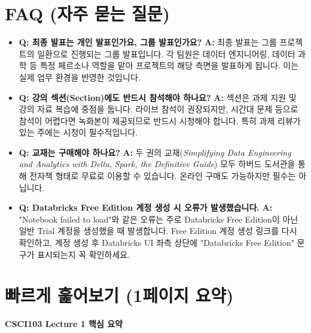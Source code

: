 \documentclass[11pt,a4paper]{article}
\theoremstyle{definition}
\begin{document}
\begin{itemize}
\newpage

\section*{FAQ (자주 묻는 질문)}

\begin{itemize}
    \item \textbf{Q: 최종 발표는 개인 발표인가요, 그룹 발표인가요?}
    \textbf{A:} 최종 발표는 그룹 프로젝트의 일환으로 진행되는 그룹 발표입니다. 각 팀원은 데이터 엔지니어링, 데이터 과학 등 특정 페르소나 역할을 맡아 프로젝트의 해당 측면을 발표하게 됩니다. 이는 실제 업무 환경을 반영한 것입니다.

    \item \textbf{Q: 강의 섹션(Section)에도 반드시 참석해야 하나요?}
    \textbf{A:} 섹션은 과제 지원 및 강의 자료 복습에 중점을 둡니다. 라이브 참석이 권장되지만, 시간대 문제 등으로 참석이 어렵다면 녹화본이 제공되므로 반드시 시청해야 합니다. 특히 과제 리뷰가 있는 주에는 시청이 필수적입니다.

    \item \textbf{Q: 교재는 구매해야 하나요?}
    \textbf{A:} 두 권의 교재(\textit{Simplifying Data Engineering and Analytics with Delta}, \textit{Spark, the Definitive Guide}) 모두 하버드 도서관을 통해 전자책 형태로 무료로 이용할 수 있습니다. 온라인 구매도 가능하지만 필수는 아닙니다.

    \item \textbf{Q: Databricks Free Edition 계정 생성 시 오류가 발생했습니다.}
    \textbf{A:} "Notebook failed to load"와 같은 오류는 주로 Databricks Free Edition이 아닌 일반 Trial 계정을 생성했을 때 발생합니다. Free Edition 계정 생성 링크를 다시 확인하고, 계정 생성 후 Databricks UI 좌측 상단에 "Databricks Free Edition" 문구가 표시되는지 꼭 확인하세요.
\end{itemize}

\newpage

\section*{빠르게 훑어보기 (1페이지 요약)}

\begin{summarybox}
\textbf{CSCI103 Lecture 1 핵심 요약}


\end{summarybox}
\end{itemize}
\end{document}

